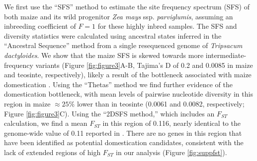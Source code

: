 \documentclass[10pt,a4paper]{article}
\newcommand{\fst}{${F_{ST}}$ }
\begin{document}
We first use the ``SFS'' method to estimate the site frequency spectrum (SFS) of both maize and its wild progenitor \textit{Zea mays} ssp. \textit{parviglumis}, assuming an inbreeding coefficient of $F=1$ for these highly inbred samples. 
The SFS and diversity statistics were calculated using ancestral states inferred in the ``Ancestral Sequence'' method from a single resequenced genome of \textit{Tripsacum dactyloides}.  
We show that the maize SFS is skewed towards more intermediate-frequency variants (Figure \ref{fig:figure3}A-B, Tajima's D of 0.2 and 0.0085 in maize and teosinte, respectively), likely a result of the bottleneck associated with maize domestication \citep{eyre1998investigation, Beissinger031666}.
Using the ``Thetas'' method we find further evidence of the domestication bottleneck, with mean levels of pairwise nucleotide diversity in this region in maize $\approx 25\%$ lower than in teosinte (0.0061 and 0.0082, respectively; Figure \ref{fig:figure3}C). 
Using the ``2DSFS method,'' which includes an \fst calculation, we find a mean \fst in this region of 0.116, nearly identical to the  genome-wide value of 0.11 reported in \cite{hufford2012comparative}.   
There are no genes in this region that have  been identified as potential domestication candidates, consistent with the lack of extended regions of high \fst in our analysis (Figure \ref{fig:suppfst}).
\end{document}
